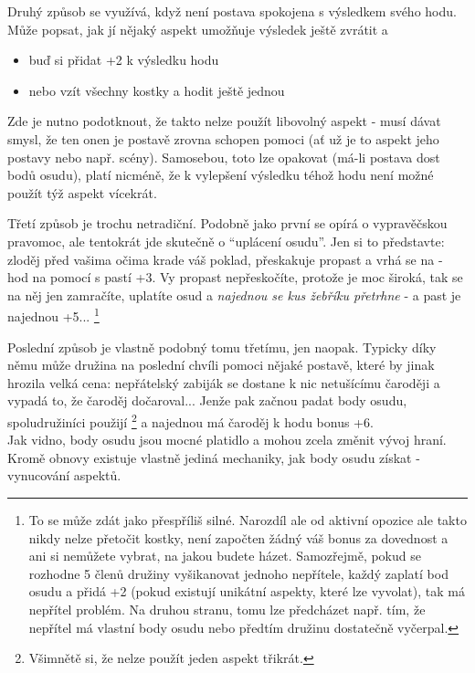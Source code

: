 Druhý způsob se využívá, když není postava spokojena s výsledkem svého hodu. Může popsat, jak jí nějaký aspekt umožňuje výsledek ještě zvrátit a

\begin{itemize}
\item buď si přidat +2 k výsledku hodu
\item nebo vzít všechny kostky a hodit ještě jednou
\end{itemize}

Zde je nutno podotknout, že takto nelze použít libovolný aspekt - musí dávat smysl, že ten onen je postavě zrovna schopen pomoci (ať už je to aspekt jeho postavy nebo např. scény). Samosebou, toto lze opakovat (má-li postava dost bodů osudu), platí nicméně, že k vylepšení výsledku téhož hodu není možné použít týž aspekt vícekrát.

Třetí způsob je trochu netradiční. Podobně jako první se opírá o vypravěčskou pravomoc, ale tentokrát jde skutečně o ``uplácení osudu''. Jen si to představte: zloděj před vašima očima krade váš poklad, přeskakuje propast a vrhá se na  - hod na  pomocí  s pastí +3. Vy propast nepřeskočíte, protože je moc široká, tak se na něj jen zamračíte, uplatíte osud a \textit{najednou se kus žebříku přetrhne} - a past je najednou +5... \footnote{To se může zdát jako přespříliš silné. Narozdíl ale od aktivní opozice ale takto nikdy nelze přetočit kostky, není započten žádný váš bonus za dovednost a ani si nemůžete vybrat, na jakou budete házet. Samozřejmě, pokud se rozhodne 5 členů družiny vyšikanovat jednoho nepřítele, každý zaplatí bod osudu a přidá +2 (pokud existují unikátní aspekty, které lze vyvolat), tak má nepřítel problém. Na druhou stranu, tomu lze předcházet např. tím, že nepřítel má vlastní body osudu nebo předtím družinu dostatečně vyčerpal.}

Poslední způsob je vlastně podobný tomu třetímu, jen naopak. Typicky díky němu může družina na poslední chvíli pomoci nějaké postavě, které by jinak hrozila velká cena: nepřátelský zabiják se dostane k nic netušícímu čaroději a vypadá to, že čaroděj dočaroval... Jenže pak začnou padat body osudu, spoludružiníci použijí  \footnote{Všimnětě si, že nelze použít jeden aspekt třikrát.} a najednou má čaroděj k hodu bonus +6. \\

Jak vidno, body osudu jsou mocné platidlo a mohou zcela změnit vývoj hraní. Kromě obnovy existuje vlastně jediná mechaniky, jak body osudu získat - vynucování aspektů.

